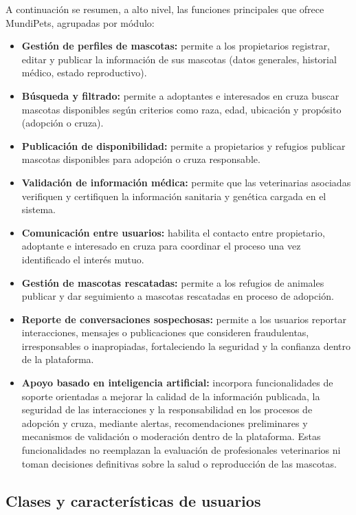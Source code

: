 \documentclass[journal,onecolumn]{IEEEtran}
\begin{document}
	A continuación se resumen, a alto nivel, las funciones principales que ofrece
	MundiPets, agrupadas por módulo:
	
	\begin{itemize}[leftmargin=*]
		\item \textbf{Gestión de perfiles de mascotas:} permite a los propietarios registrar, editar y publicar la información de sus mascotas (datos generales, historial médico, estado reproductivo).
		\item \textbf{Búsqueda y filtrado:} permite a adoptantes e interesados en cruza buscar mascotas disponibles según criterios como raza, edad, ubicación y propósito (adopción o cruza).
		\item \textbf{Publicación de disponibilidad:} permite a propietarios y refugios publicar mascotas disponibles para adopción o cruza responsable.
		\item \textbf{Validación de información médica:} permite que las veterinarias asociadas verifiquen y certifiquen la información sanitaria y genética cargada en el sistema.
		\item \textbf{Comunicación entre usuarios:} habilita el contacto entre propietario, adoptante e interesado en cruza para coordinar el proceso una vez identificado el interés mutuo.
		\item \textbf{Gestión de mascotas rescatadas:} permite a los refugios de animales publicar y dar seguimiento a mascotas rescatadas en proceso de adopción.
		\item \textbf{Reporte de conversaciones sospechosas:} permite a los usuarios reportar interacciones, mensajes o publicaciones que consideren fraudulentas, irresponsables o inapropiadas, fortaleciendo la seguridad y la confianza dentro de la plataforma.
		\item \textbf{Apoyo basado en inteligencia artificial:} incorpora funcionalidades de soporte orientadas a mejorar la calidad de la información publicada, la seguridad de las interacciones y la responsabilidad en los procesos de adopción y cruza, mediante alertas, recomendaciones preliminares y mecanismos de validación o moderación dentro de la plataforma. Estas funcionalidades no reemplazan la evaluación de profesionales veterinarios ni toman decisiones definitivas sobre la salud o reproducción de las mascotas.
	\end{itemize}
	
	\subsection{Clases y características de usuarios}
	\label{sec:perfiles}
	
\end{document}
